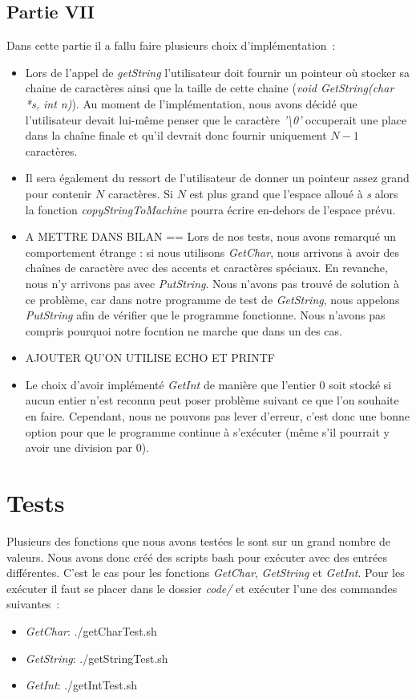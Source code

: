 \documentclass{article}
\begin{document}
\subsection{Partie VII}
Dans cette partie il a fallu faire plusieurs choix d'implémentation :
\begin{itemize}
    \item Lors de l'appel de \textit{getString} l'utilisateur doit fournir un pointeur où
          stocker sa chaine de caractères ainsi que la taille de cette chaine \linebreak
          (\textit{void GetString(char *s, int n)}). Au moment de l'implémentation, nous
          avons décidé que l'utilisateur devait lui-même penser que le caractère
          \textit{'\textbackslash0'} occuperait une place dans la chaîne finale et qu'il
          devrait donc fournir uniquement $N-1$ caractères.
    \item Il sera également du ressort de l'utilisateur de donner un pointeur assez grand
          pour contenir $N$ caractères. Si $N$ est plus grand que l'espace alloué à
          \textit{s} alors la fonction \textit{copyStringToMachine} pourra écrire
          en-dehors de l'espace prévu.
    \item A METTRE DANS BILAN == Lors de nos tests, nous avons remarqué un comportement étrange : si nous utilisons
          \textit{GetChar}, nous arrivons à avoir des chaînes de caractère avec des accents 
          et caractères spéciaux. En revanche, nous n'y arrivons pas avec \textit{PutString}.
          Nous n'avons pas trouvé de solution à ce problème, car dans notre programme de test de 
          \textit{GetString}, nous appelons \textit{PutString} afin de vérifier que le programme fonctionne.
          Nous n'avons pas compris pourquoi notre focntion ne marche que dans un des cas.
    \item AJOUTER QU'ON UTILISE ECHO ET PRINTF
    \item Le choix d'avoir implémenté \textit{GetInt} de manière que l'entier 0 soit stocké
    si aucun entier n'est reconnu peut poser problème suivant ce que l'on souhaite en faire. Cependant,
    nous ne pouvons pas lever d'erreur, c'est donc une bonne option pour que le programme continue à s'exécuter
    (même s'il pourrait y avoir une division par 0).
\end{itemize}

\section{Tests}
Plusieurs des fonctions que nous avons testées le sont sur un grand nombre de valeurs.
Nous avons donc créé des scripts bash pour exécuter avec des entrées différentes.
C'est le cas pour les fonctions \textit{GetChar}, \textit{GetString} et \textit{GetInt}.
Pour les exécuter il faut se placer dans le dossier \textit{code/} et exécuter l'une 
des commandes suivantes :
\begin{itemize}
    \item \textit{GetChar}: ./getCharTest.sh
    \item \textit{GetString}: ./getStringTest.sh
    \item \textit{GetInt}: ./getIntTest.sh
\end{itemize}
\end{document}
